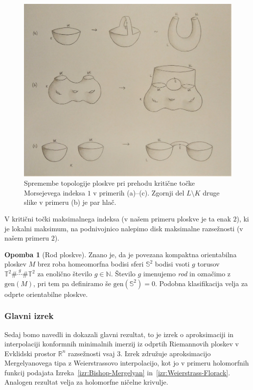 \documentclass[12pt,a4paper,twoside]{article}
\theoremstyle{definition} %
\newtheorem{opomba}[definicija]{Opomba}
\theoremstyle{plain} %
\numberwithin{equation}{section}  %
\begin{document}
\begin{figure}[h!]
\begin{center}
\includegraphics[scale=0.12]{images/morse.jpg}
\caption{Spremembe topologije ploskve pri prehodu kritične točke Morsejevega indeksa $1$ v primerih (a)--(c). Zgornji del $L \setminus K$ druge slike v primeru (b) je par hlač.}
\end{center}
\end{figure}

V kritični točki maksimalnega indeksa (v našem primeru ploskve je ta enak $2$), ki je lokalni maksimum, na podnivojnico nalepimo disk maksimalne razsežnosti (v našem primeru $2$).

\begin{opomba} [Rod ploskve]
Znano je, da je povezana kompaktna orientabilna ploskev $M$ brez roba homeomorfna bodisi sferi $\mathbb{S}^{2}$ bodisi vsoti $g$ torusov 
$\mathbb{T}^{2} \# \stackrel{g}{\cdots} \# \mathbb{T}^{2}$ za enolično število $g \in \mathbb{N}$.
Število $g$ imenujemo \emph{rod} in označimo z $\text{gen}(M)$, pri tem pa definiramo še $\text{gen}(\mathbb{S}^{2}) = 0$.
Podobna klasifikacija velja za odprte orientabilne ploskve.
\end{opomba}

\subsubsection{Glavni izrek}
%
Sedaj bomo navedli in dokazali glavni rezultat, to je izrek o aproksimaciji in interpolaciji konformnih minimalnih imerzij iz odprtih Riemannovih ploskev v Evklidski prostor $\mathbb{R}^{n}$ razsežnosti vsaj $3$. Izrek združuje aproksimacijo Mergelyanovega tipa z Weierstrassovo interpolacijo, kot jo v primeru holomorfnih funkcij podajata Izreka~\ref{izr:Bishop-Mergelyan} in~\ref{izr:Weierstrass-Florack}.
Analogen rezultat velja za holomorfne ničelne krivulje.
\end{document}

